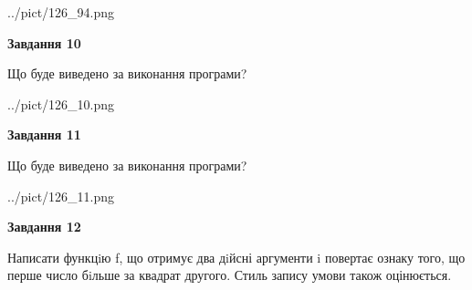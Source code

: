 \documentclass[12pt, ukrainian]{article}
\begin{document}
{\begin {large}
\begin{center}
	{../pict/126_94.png}
\end{center}
\newpage

{\begin {center}\textbf{Завдання 10}\end {center}}

Що буде виведено за виконання програми?\par
\begin{center}
	{../pict/126_10.png}
\end{center}
\newpage

{\begin {center}\textbf{Завдання 11}\end {center}}

Що буде виведено за виконання програми?\par
\begin{center}
	{../pict/126_11.png}
\end{center}
\newpage

{\begin {center}\textbf{Завдання 12}\end {center}}


Написати функцiю f, що отримує два дiйсні аргументи i повертає ознаку того, що перше число бiльше за квадрат другого. Стиль запису умови також оцінюється.\par
\newpage

\end {large}}
\end{document}

